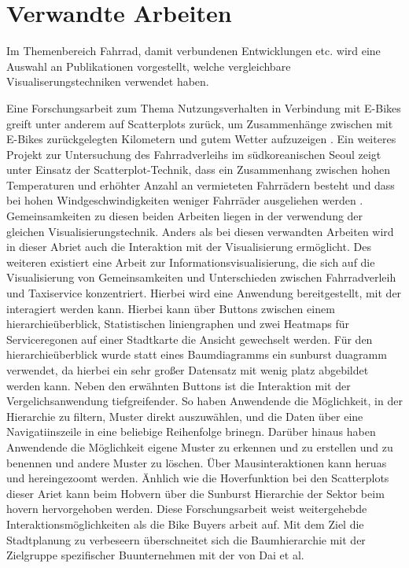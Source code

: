 \documentclass[usegeometry=true]{scrartcl}
\begin{document}
\section{Verwandte Arbeiten}
Im Themenbereich Fahrrad, damit verbundenen Entwicklungen etc. wird eine Auswahl an Publikationen vorgestellt, welche vergleichbare Visualiserungstechniken verwendet haben. 

Eine Forschungsarbeit zum Thema Nutzungsverhalten in Verbindung mit E-Bikes greift unter anderem auf Scatterplots zurück, um Zusammenhänge zwischen mit E-Bikes zurückgelegten Kilometern und gutem Wetter aufzuzeigen \cite{Rios.06212016}. Ein weiteres Projekt zur Untersuchung des Fahrradverleihs im südkoreanischen Seoul zeigt unter Einsatz der Scatterplot-Technik, dass ein Zusammenhang zwischen hohen Temperaturen und erhöhter Anzahl an vermieteten Fahrrädern besteht und dass bei hohen Windgeschwindigkeiten weniger Fahrräder ausgeliehen werden \cite{Kashyap.2021}. Gemeinsamkeiten zu diesen beiden Arbeiten liegen in der verwendung der gleichen Visualisierungstechnik. Anders als bei diesen verwandten Arbeiten wird in dieser Abriet auch die Interaktion mit der Visualisierung ermöglicht. 
Des weiteren existiert eine Arbeit zur Informationsvisualisierung, die sich auf die Visualisierung von Gemeinsamkeiten und Unterschieden zwischen Fahrradverleih und Taxiservice konzentriert. Hierbei wird eine Anwendung bereitgestellt, mit der interagiert werden kann. Hierbei kann über Buttons zwischen einem hierarchieüberblick, Statistischen liniengraphen und zwei Heatmaps für Serviceregonen auf einer Stadtkarte die Ansicht gewechselt werden. Für den hierarchieüberblick wurde statt eines Baumdiagramms ein sunburst duagramm verwendet, da hierbei ein sehr großer Datensatz mit wenig platz abgebildet werden kann. Neben den erwähnten Buttons ist die Interaktion mit der Vergelichsanwendung tiefgreifender. So haben Anwendende die Möglichkeit, in der Hierarchie zu filtern, Muster direkt auszuwählen, und die Daten über eine Navigatiinszeile in eine beliebige Reihenfolge brinegn. Darüber hinaus haben Anwendende die Möglichkeit eigene Muster zu erkennen und zu erstellen und zu benennen und andere Muster zu löschen. Über Mausinteraktionen kann heruas und hereingezoomt werden. Änhlich wie die Hoverfunktion bei den Scatterplots dieser Ariet kann beim Hobvern über die Sunburst Hierarchie der Sektor beim hovern hervorgehoben werden. Diese Forschungsarbeit weist weitergehebde Interaktionsmöglichkeiten als die Bike Buyers arbeit auf. Mit dem Ziel die Stadtplanung zu verbeseern überschneitet sich die Baumhierarchie mit der Zielgruppe spezifischer Buunternehmen mit der von Dai et al. \cite{Dai.2020}
\end{document}
